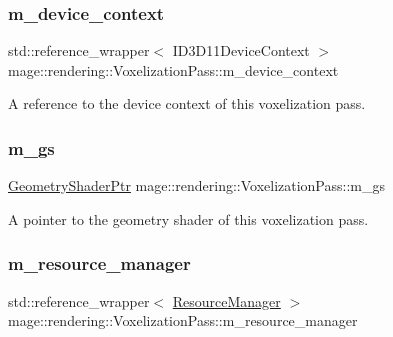 \subsubsection{\texorpdfstring{m\+\_\+device\+\_\+context}{m\_device\_context}}
{\footnotesize\ttfamily std\+::reference\+\_\+wrapper$<$ I\+D3\+D11\+Device\+Context $>$ mage\+::rendering\+::\+Voxelization\+Pass\+::m\+\_\+device\+\_\+context\hspace{0.3cm}{\ttfamily [private]}}

A reference to the device context of this voxelization pass. \hypertarget{classmage_1_1rendering_1_1_voxelization_pass_ac6161a5ea8a4203c4026afecf90755d4}{}\label{classmage_1_1rendering_1_1_voxelization_pass_ac6161a5ea8a4203c4026afecf90755d4} 
\subsubsection{\texorpdfstring{m\+\_\+gs}{m\_gs}}
{\footnotesize\ttfamily \hyperlink{namespacemage_1_1rendering_aa5d63f80f9483d0896718813768ba1cf}{Geometry\+Shader\+Ptr} mage\+::rendering\+::\+Voxelization\+Pass\+::m\+\_\+gs\hspace{0.3cm}{\ttfamily [private]}}

A pointer to the geometry shader of this voxelization pass. \hypertarget{classmage_1_1rendering_1_1_voxelization_pass_aadfa94217df7498078ae49effc6b438b}{}\label{classmage_1_1rendering_1_1_voxelization_pass_aadfa94217df7498078ae49effc6b438b} 
\subsubsection{\texorpdfstring{m\+\_\+resource\+\_\+manager}{m\_resource\_manager}}
{\footnotesize\ttfamily std\+::reference\+\_\+wrapper$<$ \hyperlink{classmage_1_1rendering_1_1_resource_manager}{Resource\+Manager} $>$ mage\+::rendering\+::\+Voxelization\+Pass\+::m\+\_\+resource\+\_\+manager\hspace{0.3cm}{\ttfamily [private]}}

